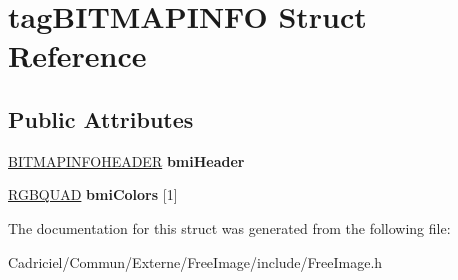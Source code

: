 \hypertarget{structtag_b_i_t_m_a_p_i_n_f_o}{\section{tag\-B\-I\-T\-M\-A\-P\-I\-N\-F\-O Struct Reference}
\label{structtag_b_i_t_m_a_p_i_n_f_o}
}
\subsection*{Public Attributes}
\begin{DoxyCompactItemize}
\item 
\hypertarget{structtag_b_i_t_m_a_p_i_n_f_o_a1cbcd562dccbedec498b504f247405c3}{\hyperlink{structtag_b_i_t_m_a_p_i_n_f_o_h_e_a_d_e_r}{B\-I\-T\-M\-A\-P\-I\-N\-F\-O\-H\-E\-A\-D\-E\-R} {\bfseries bmi\-Header}}\label{structtag_b_i_t_m_a_p_i_n_f_o_a1cbcd562dccbedec498b504f247405c3}

\item 
\hypertarget{structtag_b_i_t_m_a_p_i_n_f_o_a5a9747ecf91e36b60469f6483ec1980e}{\hyperlink{structtag_r_g_b_q_u_a_d}{R\-G\-B\-Q\-U\-A\-D} {\bfseries bmi\-Colors} \mbox{[}1\mbox{]}}\label{structtag_b_i_t_m_a_p_i_n_f_o_a5a9747ecf91e36b60469f6483ec1980e}

\end{DoxyCompactItemize}


The documentation for this struct was generated from the following file\-:\begin{DoxyCompactItemize}
\item 
Cadriciel/\-Commun/\-Externe/\-Free\-Image/include/Free\-Image.\-h\end{DoxyCompactItemize}
